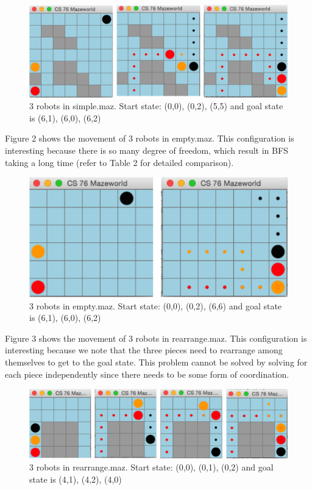 \documentclass[9.5pt]{extarticle}
\begin{document}
\begin{figure}[H]
\centering
\includegraphics[scale=0.40]{simple_multi.png}
\caption{3 robots in simple.maz. Start state: (0,0), (0,2), (5,5) and goal state is (6,1), (6,0), (6,2) }
\label{Figure 1}
\end{figure}

Figure 2 shows the movement of 3 robots in empty.maz. This configuration is interesting because there is so many degree of freedom, which result in BFS taking a long time  (refer to Table 2 for detailed comparison).

\begin{figure}[H]
\centering
\includegraphics[scale=0.45]{empty_multi.png}
\caption{3 robots in empty.maz. Start state: (0,0), (0,2), (6,6) and goal state is (6,1), (6,0), (6,2) }
\label{Figure 2}
\end{figure}

Figure 3 shows the movement of 3 robots in rearrange.maz. This configuration is interesting because we note that the three pieces need to rearrange among themselves to get to the goal state. This problem cannot be solved by solving for each piece independently since there needs to be some form of coordination.

\begin{figure}[H]
\centering
\includegraphics[scale=0.55]{rearrange_multi.png}
\caption{3 robots in rearrange.maz. Start state: (0,0), (0,1), (0,2) and goal state is (4,1), (4,2), (4,0) }
\label{Figure 3}
\end{figure}
\end{document}
